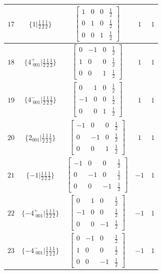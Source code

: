 \documentclass[fleqn,8pt]{jsarticle}
\begin{document}
\begin{longtable}{ccccc}
$ 17 $ & $ \{1|\frac{1}{2} \frac{1}{2} \frac{1}{2}\} $ & $ \begin{bmatrix} 1 & 0 & 0 & \frac{1}{2} \\ 0 & 1 & 0 & \frac{1}{2} \\ 0 & 0 & 1 & \frac{1}{2} \end{bmatrix} $ & $ 1 $ & $ 1 $ \\ \hline
$ 18 $ & $ \{4^{+}_{\,\,001}|\frac{1}{2} \frac{1}{2} \frac{1}{2}\} $ & $ \begin{bmatrix} 0 & -1 & 0 & \frac{1}{2} \\ 1 & 0 & 0 & \frac{1}{2} \\ 0 & 0 & 1 & \frac{1}{2} \end{bmatrix} $ & $ 1 $ & $ 1 $ \\ \hline
$ 19 $ & $ \{4^{-}_{\,\,001}|\frac{1}{2} \frac{1}{2} \frac{1}{2}\} $ & $ \begin{bmatrix} 0 & 1 & 0 & \frac{1}{2} \\ -1 & 0 & 0 & \frac{1}{2} \\ 0 & 0 & 1 & \frac{1}{2} \end{bmatrix} $ & $ 1 $ & $ 1 $ \\ \hline
$ 20 $ & $ \{2{}_{001}|\frac{1}{2} \frac{1}{2} \frac{1}{2}\} $ & $ \begin{bmatrix} -1 & 0 & 0 & \frac{1}{2} \\ 0 & -1 & 0 & \frac{1}{2} \\ 0 & 0 & 1 & \frac{1}{2} \end{bmatrix} $ & $ 1 $ & $ 1 $ \\ \hline
$ 21 $ & $ \{-1|\frac{1}{2} \frac{1}{2} \frac{1}{2}\} $ & $ \begin{bmatrix} -1 & 0 & 0 & \frac{1}{2} \\ 0 & -1 & 0 & \frac{1}{2} \\ 0 & 0 & -1 & \frac{1}{2} \end{bmatrix} $ & $ -1 $ & $ 1 $ \\ \hline
$ 22 $ & $ \{-4^{+}_{\,\,001}|\frac{1}{2} \frac{1}{2} \frac{1}{2}\} $ & $ \begin{bmatrix} 0 & 1 & 0 & \frac{1}{2} \\ -1 & 0 & 0 & \frac{1}{2} \\ 0 & 0 & -1 & \frac{1}{2} \end{bmatrix} $ & $ -1 $ & $ 1 $ \\ \hline
$ 23 $ & $ \{-4^{-}_{\,\,001}|\frac{1}{2} \frac{1}{2} \frac{1}{2}\} $ & $ \begin{bmatrix} 0 & -1 & 0 & \frac{1}{2} \\ 1 & 0 & 0 & \frac{1}{2} \\ 0 & 0 & -1 & \frac{1}{2} \end{bmatrix} $ & $ -1 $ & $ 1 $ \\ \hline

\end{longtable}
\end{document}
